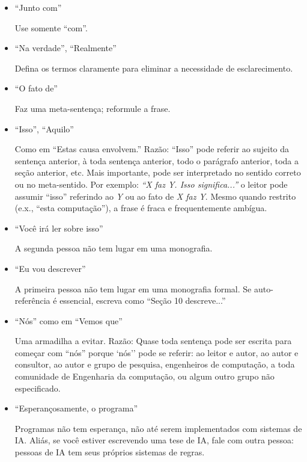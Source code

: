 \begin{itemize}
	\item ``Junto com''

		\indent Use somente ``com''.
		
	\item ``Na verdade'', ``Realmente''

		\indent Defina os termos claramente para eliminar a necessidade de esclarecimento.
		
	\item ``O fato de''

		\indent Faz uma meta-senten\c{c}a; reformule a frase.
		
	\item ``Isso'', ``Aquilo''

		\indent Como em ``Estas causa envolvem.'' Raz\~{a}o: ``Isso'' pode referir ao sujeito da senten\c{c}a anterior, à toda senten\c{c}a anterior, todo o par\'{a}grafo anterior, toda a se\c{c}\~{a}o anterior, etc. 
		Mais importante, pode ser interpretado no sentido correto ou no meta-sentido. Por exemplo: \textit{``X faz Y. Isso significa...''} o leitor pode assumir ``isso'' referindo ao 			
		\textit	{Y} ou ao fato de \textit{X faz Y}. Mesmo quando restrito (e.x., ``esta computa\c{c}\~{a}o''), a frase \'{e} fraca e frequentemente amb\'{i}gua.
		
	\item ``Você ir\'{a} ler sobre isso''

		\indent A segunda pessoa n\~{a}o tem lugar em uma monografia.
		
	\item ``Eu vou descrever''

		\indent A primeira pessoa n\~{a}o tem lugar em uma monografia formal. Se auto-referência \'{e} essencial, escreva como ``Se\c{c}\~{a}o 10 descreve...''
		
	\item ``N\'{o}s'' como em ``Vemos que''

		\indent Uma armadilha a evitar. Raz\~{a}o: Quase toda senten\c{c}a pode ser escrita para come\c{c}ar com ``n\'{o}s'' porque `n\'{o}s'' pode se referir: ao leitor e autor, ao autor e consultor, ao autor e grupo de pesquisa, engenheiros de computa\c{c}\~{a}o, a toda comunidade de Engenharia da computa\c{c}\~{a}o, ou algum outro grupo n\~{a}o especificado. 

	\item ``Esperan\c{c}osamente, o programa''

		\indent Programas n\~{a}o tem esperan\c{c}a, n\~{a}o at\'{e} serem implementados com sistemas de IA. Ali\'{a}s, se você estiver escrevendo uma tese de IA, fale com outra pessoa: pessoas de IA tem seus pr\'{o}prios sistemas de regras.
		

\end{itemize}
